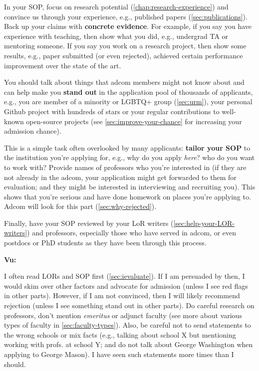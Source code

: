 \documentclass[oneside,11pt,dvipsnames]{book}
\newenvironment{commentbox}[1][]{
  \small
  \begin{mybox}
    {\small \textbf{#1}}
  }{
  \end{mybox}
}
\begin{document}

In your SOP, focus on research potential (\autoref{chap:research-experience}) and convince us through your experience, e.g., published papers (\autoref{sec:publications}). Back up your claims with \textbf{concrete evidence}. For example, if you say you have experience with teaching, then show what you did, e.g., undergrad TA or mentoring someone.  If you say you work on a research project, then show some results, e.g., paper submitted (or even rejected), achieved certain performance improvement over the state of the art. 


You should talk about things that adcom members might not know about and can help make you \textbf{stand out} in the application pool of thousands of applicants, e.g., you are member of a minority or LGBTQ+ group (\autoref{sec:urm}), your personal Github project with hundreds of stars or your regular contributions to well-known open-source projects (see \autoref{sec:improve-your-chance} for increasing your admission chance).


This is a simple task often overlooked by many applicants: \textbf{tailor your SOP} to the institution you're applying for,
e.g., why do you apply \emph{here}? who do you want to work with?
Provide names of professors who you're interested in (if they are not already in the adcom, your application might get forwarded to them for evaluation; and they might be interested in interviewing and recruiting you).
This shows that you're serious and have done homework on places you're applying to.
Adcom will look for this part (\autoref{sec:why-rejected}).

Finally, have your SOP reviewed by your LoR writers (\autoref{sec:help-your-LOR-writers}) and professors, especially those who have served in adcom, or even postdocs or PhD students as they have been through this process.

\begin{commentbox}[Vu:]
  I often read LORs and SOP first (\autoref{sec:ievaluate}). If I am
  persuaded by then, I would skim over other factors and advocate for
  admission (unless I see red flags in other parts). However, if I am not
  convinced, then I will likely recommend rejection (unless I see
  something stand out in other parts).
  \tcblower
  Do careful research on professors, don't mention \emph{emeritus} or adjunct faculty (see more about various types of faculty in \autoref{sec:faculty-types}).
  Also, be careful not to send statements to the wrong schools or mix
  facts (e.g., talking about school X but mentioning working with
  profs. at school Y; and do not talk about George Washington when applying to George Mason). I have seen such statements more times than I should.
\end{commentbox}
\end{document}
